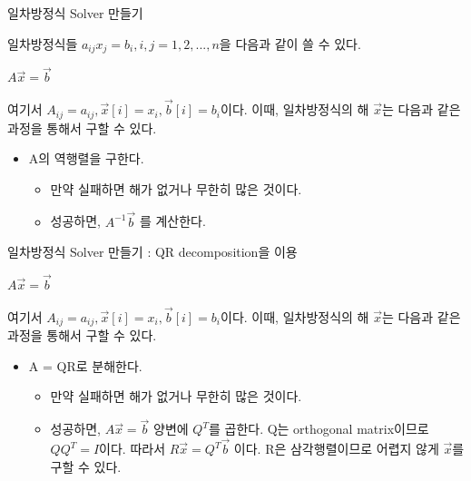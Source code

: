 \documentclass{beamer}
\begin{document}







\begin{frame}{일차방정식 Solver 만들기} 

일차방정식들 $a_{ij}x_j = b_i, i,j = 1,2,...,n$을 다음과 같이 쓸 수 있다. 

$A\vec{x} = \vec{b}$

여기서 $A_{ij} = a_{ij}, \vec{x}[i] = x_i, \vec{b}[i] = b_i$이다. 이때, 일차방정식의 해 $\vec{x}$는 다음과 같은 과정을 통해서 구할 수 있다. 

\begin{itemize} 
\item A의 역행렬을 구한다. 
\begin{itemize} 
\item 만약 실패하면 해가 없거나 무한히 많은 것이다. 
\item 성공하면, $A^{-1} \vec{b}$ 를 계산한다. 
\end{itemize}
\end{itemize}
\end{frame}

\begin{frame}{일차방정식 Solver 만들기 : QR decomposition을 이용} 

$A\vec{x} = \vec{b}$

여기서 $A_{ij} = a_{ij}, \vec{x}[i] = x_i, \vec{b}[i] = b_i$이다. 이때, 일차방정식의 해 $\vec{x}$는 다음과 같은 과정을 통해서 구할 수 있다. 

\begin{itemize} 
\item A = QR로 분해한다.  
\begin{itemize} 
\item 만약 실패하면 해가 없거나 무한히 많은 것이다. 
\item 성공하면, $A\vec{x} =\vec{b}$ 양변에 $Q^T$를 곱한다. Q는 orthogonal matrix이므로 $QQ^T=I$이다. 따라서 $R\vec{x} = Q^T\vec{b}$ 이다. R은 삼각행렬이므로 어렵지 않게 $\vec{x}$를 구할 수 있다. 
\end{itemize}
\end{itemize}
\end{frame}
\end{document}
